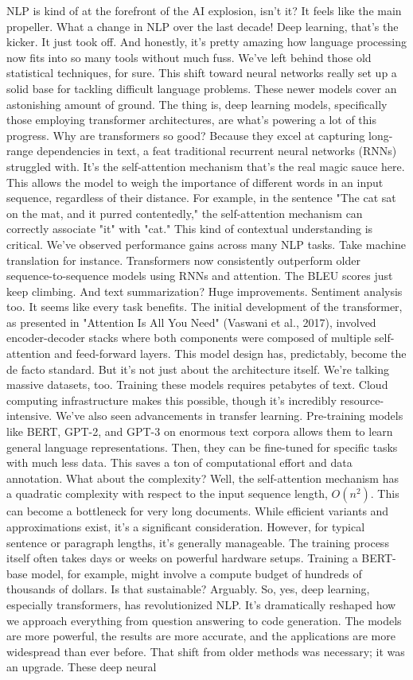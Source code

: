 \documentclass{article}
\begin{document}
NLP is kind of at the forefront of the AI explosion, isn't it? It feels like the main propeller. What a change in NLP over the last decade! Deep learning, that's the kicker. It just took off. And honestly, it’s pretty amazing how language processing now fits into so many tools without much fuss. We've left behind those old statistical techniques, for sure. This shift toward neural networks really set up a solid base for tackling difficult language problems. These newer models cover an astonishing amount of ground. The thing is, deep learning models, specifically those employing transformer architectures, are what’s powering a lot of this progress. Why are transformers so good? Because they excel at capturing long-range dependencies in text, a feat traditional recurrent neural networks (RNNs) struggled with. It’s the self-attention mechanism that’s the real magic sauce here. This allows the model to weigh the importance of different words in an input sequence, regardless of their distance. For example, in the sentence "The cat sat on the mat, and it purred contentedly," the self-attention mechanism can correctly associate "it" with "cat." This kind of contextual understanding is critical. We've observed performance gains across many NLP tasks. Take machine translation for instance. Transformers now consistently outperform older sequence-to-sequence models using RNNs and attention. The BLEU scores just keep climbing. And text summarization? Huge improvements. Sentiment analysis too. It seems like every task benefits. The initial development of the transformer, as presented in "Attention Is All You Need" (Vaswani et al., 2017), involved encoder-decoder stacks where both components were composed of multiple self-attention and feed-forward layers. This model design has, predictably, become the de facto standard. But it's not just about the architecture itself. We’re talking massive datasets, too. Training these models requires petabytes of text. Cloud computing infrastructure makes this possible, though it’s incredibly resource-intensive. We’ve also seen advancements in transfer learning. Pre-training models like BERT, GPT-2, and GPT-3 on enormous text corpora allows them to learn general language representations. Then, they can be fine-tuned for specific tasks with much less data. This saves a ton of computational effort and data annotation. What about the complexity? Well, the self-attention mechanism has a quadratic complexity with respect to the input sequence length, $O(n^2)$. This can become a bottleneck for very long documents. While efficient variants and approximations exist, it's a significant consideration. However, for typical sentence or paragraph lengths, it’s generally manageable. The training process itself often takes days or weeks on powerful hardware setups. Training a BERT-base model, for example, might involve a compute budget of hundreds of thousands of dollars. Is that sustainable? Arguably. So, yes, deep learning, especially transformers, has revolutionized NLP. It’s dramatically reshaped how we approach everything from question answering to code generation. The models are more powerful, the results are more accurate, and the applications are more widespread than ever before. That shift from older methods was necessary; it was an upgrade. These deep neural 
\end{document}
